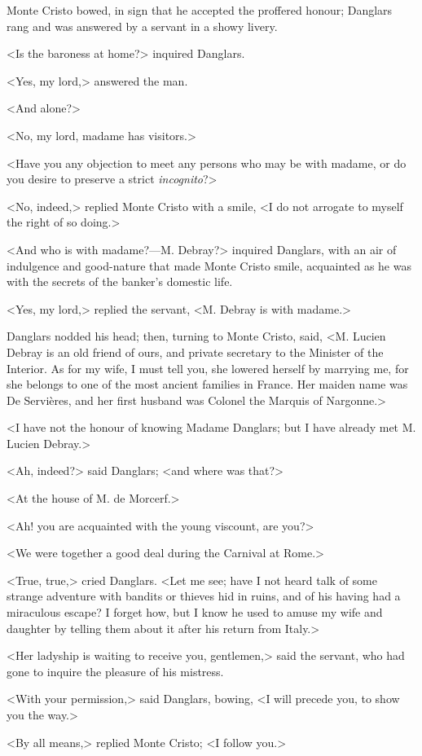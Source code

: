  Monte Cristo bowed, in sign that he accepted the proffered honour; Danglars rang and was answered by a servant in a showy livery. 

 <Is the baroness at home?> inquired Danglars. 

 <Yes, my lord,> answered the man. 

 <And alone?> 

 <No, my lord, madame has visitors.> 

 <Have you any objection to meet any persons who may be with madame, or do you desire to preserve a strict \textit{incognito}?> 

 <No, indeed,> replied Monte Cristo with a smile, <I do not arrogate to myself the right of so doing.> 

 <And who is with madame?—M. Debray?> inquired Danglars, with an air of indulgence and good-nature that made Monte Cristo smile, acquainted as he was with the secrets of the banker's domestic life. 

 <Yes, my lord,> replied the servant, <M. Debray is with madame.> 

 Danglars nodded his head; then, turning to Monte Cristo, said, <M. Lucien Debray is an old friend of ours, and private secretary to the Minister of the Interior. As for my wife, I must tell you, she lowered herself by marrying me, for she belongs to one of the most ancient families in France. Her maiden name was De Servières, and her first husband was Colonel the Marquis of Nargonne.> 

 <I have not the honour of knowing Madame Danglars; but I have already met M. Lucien Debray.> 

 <Ah, indeed?> said Danglars; <and where was that?> 

 <At the house of M. de Morcerf.> 

 <Ah! you are acquainted with the young viscount, are you?> 

 <We were together a good deal during the Carnival at Rome.> 

 <True, true,> cried Danglars. <Let me see; have I not heard talk of some strange adventure with bandits or thieves hid in ruins, and of his having had a miraculous escape? I forget how, but I know he used to amuse my wife and daughter by telling them about it after his return from Italy.> 

 <Her ladyship is waiting to receive you, gentlemen,> said the servant, who had gone to inquire the pleasure of his mistress. 

 <With your permission,> said Danglars, bowing, <I will precede you, to show you the way.> 

 <By all means,> replied Monte Cristo; <I follow you.> 
